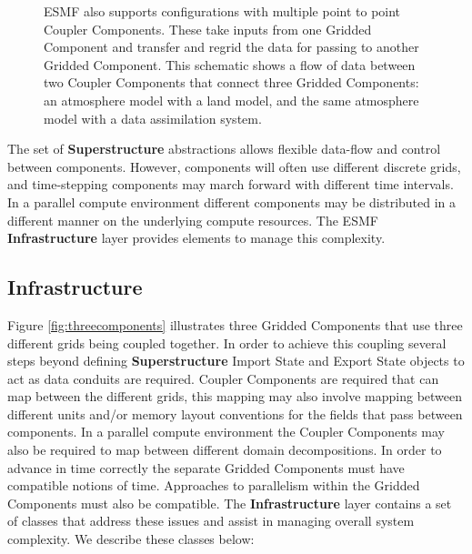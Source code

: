 \begin{figure}
\caption{ESMF also supports configurations with multiple point to point Coupler Components. 
These take inputs from one Gridded
Component and transfer and regrid the data for passing to another Gridded Component. This schematic shows a 
flow of data between two Coupler Components that connect three Gridded Components:  an atmosphere model with a land model, and the same atmosphere model with a data assimilation system.}
\label{fig:point2point}
\end{figure}

The set of {\bf Superstructure} abstractions allows flexible data-flow and control between components. However, 
components will often use different discrete grids, and time-stepping components may march forward with different time
intervals. In a parallel compute environment different components may be distributed in a different manner on the
underlying compute resources. The ESMF {\bf Infrastructure} layer provides elements to manage this complexity.

\subsection{Infrastructure}
\label{sec:infrastructure}
Figure \ref{fig:threecomponents} illustrates three Gridded Components that use three different grids being coupled together. In 
order to achieve this coupling several steps beyond defining {\bf Superstructure} Import State and Export State objects to act
as data conduits are required. Coupler Components are required that can map between the different
grids, this mapping may also involve mapping between different units and/or memory layout conventions for the fields that
pass between components. In a parallel compute environment the Coupler Components may also be required to map between different 
domain decompositions. In order to advance in time correctly the separate Gridded Components must have compatible notions
of time. Approaches to parallelism within the Gridded Components must also be compatible. The {\bf Infrastructure} layer
contains a set of classes that address these issues and assist in managing overall system complexity. We describe
these classes below:

